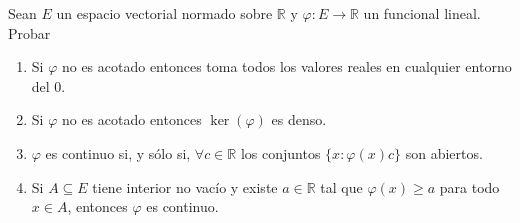 \documentclass{article}
\theoremstyle{definition}
\newcommand{\R}{\mathbb{R}}
\newenvironment{ejercicio}[1]{\begin{trivlist}
\item[\hskip \labelsep {\bfseries Ejercicio}\hskip \labelsep {\bfseries #1.}]}{\end{trivlist}}
\begin{document}
\begin{ejercicio}{2}
    Sean \(E\) un espacio vectorial normado sobre \( \R \) y \( \varphi:E\to\R \) un funcional lineal. Probar
    \begin{enumerate}
        \item Si \( \varphi \) no es acotado entonces toma todos los valores reales en cualquier entorno del \(0\).
        \item Si \( \varphi \) no es acotado entonces \( \ker(\varphi) \) es denso.
        \item \( \varphi \) es continuo si, y sólo si, \( \forall c\in\R \) los conjuntos \( \{x:\varphi(x)c\} \) son abiertos.
        \item Si \( A\subseteq E \) tiene interior no vacío y existe \( a\in\R \) tal que \( \varphi(x)\geq a \) para todo \( x\in A \), entonces \( \varphi \) es continuo.
    \end{enumerate}
\end{ejercicio}
\end{document}
